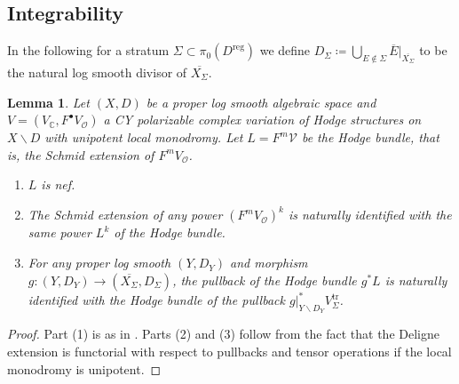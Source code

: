 \documentclass{amsart}
\newcommand{\bs}{\backslash}
\newcommand{\ol}{\overline}
\newtheorem{lem}[theorem]{Lemma}
\theoremstyle{definition}
\theoremstyle{remark}
\def\bC{\mathbb{C}}
\def\cO{\mathcal{O}}
\def\cV{\mathcal{V}}
\def\reg{\mathrm{reg}}
\def\trans{\mathrm{tr}}
\def\pmax{m}
\renewcommand{\bar}[1]{\ol{#1}}
\numberwithin{equation}{section}
\begin{document}
\subsection{Integrability}\label{subsect:integrability}
In the following for a stratum $\Sigma\subset \pi_0(D^\reg)$ we define $D_\Sigma\coloneqq  \bigcup_{E\notin\Sigma}\bar E|_{\overline{X_\Sigma}}$ to be the natural log smooth divisor of $\overline{X_\Sigma}$.
\begin{lem}\label{lem:everything is compatible}Let $(X,D)$ be a proper log smooth algebraic space and $V=(V_\bC,F^\bullet V_\cO)$ a CY polarizable complex variation of Hodge structures on $X\bs D$ with unipotent local monodromy.  Let $L=F^\pmax \cV$ be the Hodge bundle, that is, the Schmid extension of $F^\pmax V_\cO$.

\begin{enumerate}
\item $L$ is nef.
\item The Schmid extension of any power $(F^mV_\cO)^k$ is naturally identified with the same power $L^k$ of the Hodge bundle.
\item For any proper log smooth $(Y,D_Y)$ and morphism $g\colon (Y,D_Y)\to (\overline{X_\Sigma},D_\Sigma)$, the pullback of the Hodge bundle $g^*L$ is naturally identified with the Hodge bundle of the pullback $g|_{Y\bs D_Y}^*V^\trans_\Sigma$. 
\end{enumerate}
\end{lem}
\begin{proof}  Part (1) is as in \cite[Lemma 6.15]{BBT23}.  Parts (2) and (3) follow from the fact that the Deligne extension is functorial with respect to pullbacks and tensor operations if the local monodromy is unipotent. 
\end{proof}
\end{document}
